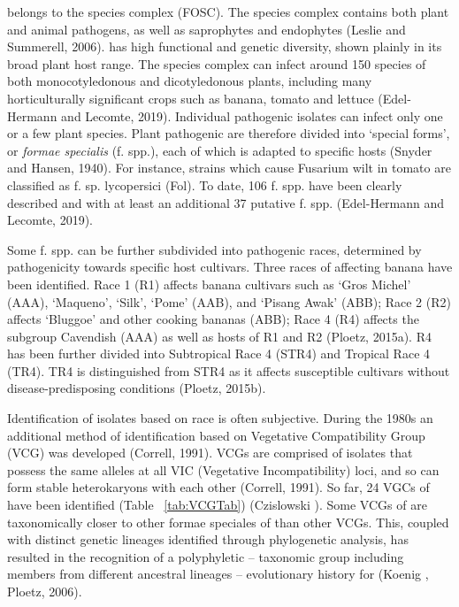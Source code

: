 \Foc belongs to the \Fo species complex (FOSC). The species complex contains both plant and animal pathogens, as well as saprophytes and endophytes (Leslie and Summerell, 2006). \Foxy has high functional and genetic diversity, shown plainly in its broad plant host range. The species complex can infect around 150 species of both monocotyledonous and dicotyledonous plants, including many horticulturally significant crops such as banana, tomato and lettuce  (Edel-Hermann and Lecomte, 2019).  Individual pathogenic \Foxy isolates can infect only one or a few plant species. Plant pathogenic \Foxy are therefore divided into ‘special forms’, or \textit{formae specialis} (f. spp.), each of which is adapted to specific hosts (Snyder and Hansen, 1940). For instance, strains which cause Fusarium wilt in tomato are classified as \Fo f. sp.  lycopersici (Fol). To date, 106 f. spp. have been clearly described and with at least an additional 37 putative f. spp. (Edel-Hermann and Lecomte, 2019).   

Some f. spp. can be further subdivided into pathogenic races, determined by pathogenicity towards specific host cultivars. Three races of \Foc affecting banana have been identified. Race 1 (R1) affects banana cultivars such as ‘Gros Michel’ (AAA), ‘Maqueno’, ‘Silk’, ‘Pome’ (AAB), and ‘Pisang Awak’ (ABB); Race 2 (R2) affects ‘Bluggoe’ and other cooking bananas (ABB); Race 4 (R4) affects the subgroup Cavendish (AAA) as well as hosts of R1 and R2 (Ploetz, 2015a). \Foc R4 has been further divided into Subtropical Race 4 (STR4) and Tropical Race 4 (TR4). TR4 is distinguished from STR4 as it affects susceptible cultivars without disease-predisposing conditions (Ploetz, 2015b).  

Identification of isolates based on race is often subjective. During the 1980s an additional method of \Foc identification based on Vegetative Compatibility Group (VCG) was developed (Correll, 1991). VCGs are comprised of isolates that possess the same alleles at all VIC (Vegetative Incompatibility) loci, and so can form stable heterokaryons with each other (Correll, 1991). So far, 24 VGCs of \Foc have been identified (Table ~\ref{tab:VCGTab}) (Czislowski ).  Some VCGs of \Foc are taxonomically closer to other formae speciales of \Foxy than other \Foc VCGs. This, coupled with distinct genetic lineages identified through phylogenetic analysis, has resulted in the recognition of a polyphyletic – taxonomic group including members from different ancestral lineages – evolutionary history for \Foc (Koenig , Ploetz, 2006). 

